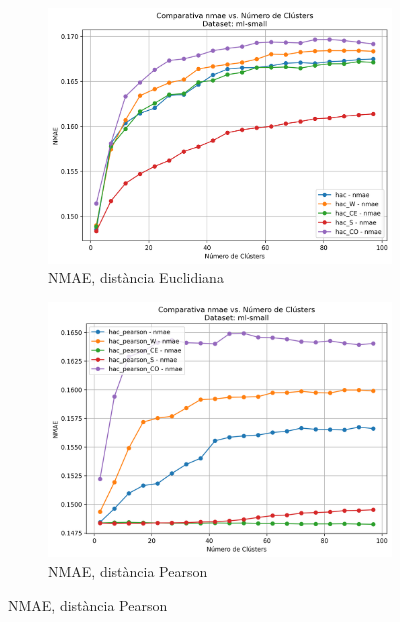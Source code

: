 \documentclass[a4paper,12pt]{report}
\begin{document}
\begin{figure}[H]
    \centering
    \begin{subfigure}[b]{0.49\textwidth}
        \includegraphics[width=\textwidth]{Figuras/nmae-euc-ml-small.png}
        \caption{NMAE, distància Euclidiana}
        \label{fig:hac-clustering-e-results-a}
    \end{subfigure}
    \hfill
    \begin{subfigure}[b]{0.49\textwidth}
        \includegraphics[width=\textwidth]{Figuras/nmae-pear-ml-small.png}
        \caption{NMAE, distància Pearson}
        \label{fig:hac-clustering-e-results-b}
    \end{subfigure}


\end{figure}
\end{document}
